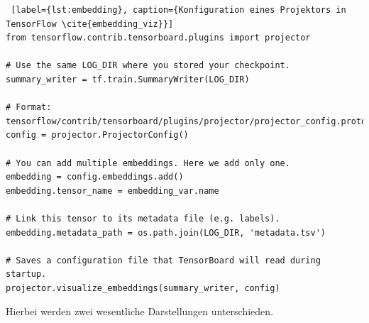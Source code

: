 \begin{minipage}{\linewidth}
\begin{lstlisting} [label={lst:embedding}, caption={Konfiguration eines Projektors in TensorFlow \cite{embedding_viz}}]
from tensorflow.contrib.tensorboard.plugins import projector

# Use the same LOG_DIR where you stored your checkpoint.
summary_writer = tf.train.SummaryWriter(LOG_DIR)

# Format: tensorflow/contrib/tensorboard/plugins/projector/projector_config.proto
config = projector.ProjectorConfig()

# You can add multiple embeddings. Here we add only one.
embedding = config.embeddings.add()
embedding.tensor_name = embedding_var.name

# Link this tensor to its metadata file (e.g. labels).
embedding.metadata_path = os.path.join(LOG_DIR, 'metadata.tsv')

# Saves a configuration file that TensorBoard will read during startup.
projector.visualize_embeddings(summary_writer, config)
\end{lstlisting}
\end{minipage}
\vspace{0.3cm}

Hierbei werden zwei wesentliche Darstellungen unterschieden.
\vspace{10pt}


